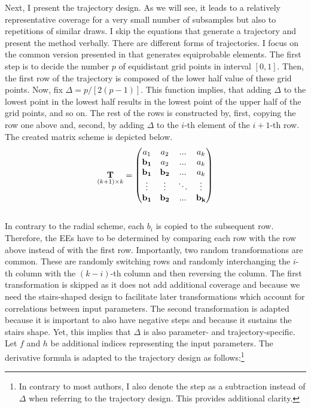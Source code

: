 \documentclass[a4paper,12pt]{article}
\begin{document}
\noindent
Next, I present the trajectory design. As we will see, it leads to a relatively representative coverage for a very small number of subsamples but also to repetitions of similar draws.
I skip the equations that generate a trajectory and present the method verbally.
There are different forms of trajectories. I focus on the common version presented in \cite{Morris.1991} that generates equiprobable elements. The first step is to decide the number $p$ of equidistant grid points in interval $[0,1]$. Then, the first row of the trajectory is composed of the lower half value of these grid points. Now, fix $\Delta = p/[2(p-1)]$. This function implies, that adding $\Delta$ to the lowest point in the lowest half results in the lowest point of the upper half of the grid points, and so on. The rest of the rows is constructed by, first, copying the row one above and, second, by adding $\Delta$ to the $i$-th element of the $i+1$-th row. The created matrix scheme is depicted below.
\begin{align}
\underset{(k+1)\times k}{\bold{T}} =
\begin{pmatrix}
a_1 & a_2 & ... & a_k \\
\bold{b_1} & a_2 & ... & a_k \\
\bold{b_1} & \bold{b_2} & ... & a_k \\
\vdots & \vdots & 	\ddots & \vdots\\
\bold{b_1} & \bold{b_2} & ... & \bold{b_k}
\end{pmatrix}
\end{align}
\\

\noindent
In contrary to the radial scheme, each $b_i$ is copied to the subsequent row. Therefore, the EEs have to be determined by comparing each row with the row above instead of with the first row.
Importantly, two random transformations are common. These are randomly switching rows and randomly interchanging the $i$-th column with the $(k-i)$-th column and then reversing the column. The first transformation is skipped as it does not add additional coverage and because we need the stairs-shaped design to facilitate later transformations which account for correlations between input parameters. The second transformation is adapted because it is important to also have negative steps and because it sustains the stairs shape. Yet, this implies that $\Delta$ is also parameter- and trajectory-specific. Let $f$ and $h$ be additional indices representing the input parameters. The derivative formula is adapted to the trajectory design as follows:\footnote{In contrary to most authors, I also denote the step as a subtraction instead of $\Delta$ when referring to the trajectory design. This provides additional clarity.}
\end{document}
